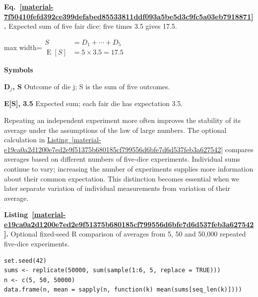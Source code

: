 \documentclass[11pt,a4paper]{article}
\newcounter{listing}
\begin{document}
\par\medskip
\noindent\begin{minipage}{\linewidth}
\label{material-7f50410fefd392ce399defabed85533811ddf093a5be5d3c9fc5a03eb7918871}
\noindent\textbf{Eq.~\ref*{material-7f50410fefd392ce399defabed85533811ddf093a5be5d3c9fc5a03eb7918871}.} Expected sum of five fair dice: five times 3.5 gives 17.5.\par\nopagebreak
\begin{center}\begin{adjustbox}{max width=\linewidth}$\displaystyle \begin{aligned}S&=D_1+\cdots+D_5\\\operatorname{E}[S]&=5\times3.5=17.5\end{aligned}$\end{adjustbox}\end{center}

\par\noindent\textbf{Symbols}

\par\noindent\textbf{D\ensuremath{{}_j}, S} Outcome of die j; S is the sum of five outcomes.

\par\noindent\textbf{E[S], 3.5} Expected sum; each fair die has expectation 3.5.

\end{minipage}\par
\medskip

Repeating an independent experiment more often improves the stability of its average under the assumptions of the law of large numbers. The optional calculation in \hyperref[material-e19ca0a2d1200e7ed2e9f51375b680185cf799556d6bfe7d6d537feb3a627542]{Listing~\ref*{material-e19ca0a2d1200e7ed2e9f51375b680185cf799556d6bfe7d6d537feb3a627542}} compares averages based on different numbers of five-dice experiments. Individual sums continue to vary; increasing the number of experiments supplies more information about their common expectation. This distinction becomes essential when we later separate variation of individual measurements from variation of their average.


\par\medskip
{}
\label{material-e19ca0a2d1200e7ed2e9f51375b680185cf799556d6bfe7d6d537feb3a627542}
\noindent\textbf{Listing~\ref*{material-e19ca0a2d1200e7ed2e9f51375b680185cf799556d6bfe7d6d537feb3a627542}.} Optional fixed-seed R comparison of averages from 5, 50 and 50,000 repeated five-dice experiments.\par\nopagebreak
\begin{Verbatim}[fontsize=\footnotesize,breaklines=true,breakanywhere=true]
set.seed(42)
sums <- replicate(50000, sum(sample(1:6, 5, replace = TRUE)))
n <- c(5, 50, 50000)
data.frame(n, mean = sapply(n, function(k) mean(sums[seq_len(k)])))
\end{Verbatim}
\end{document}
